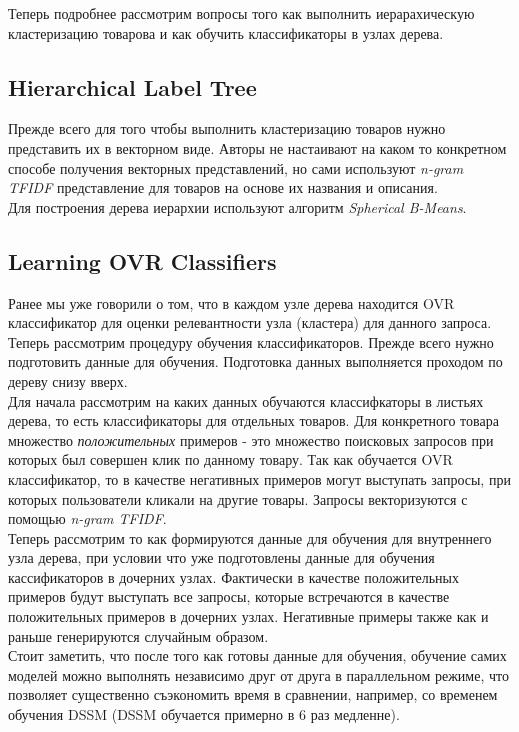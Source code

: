Теперь подробнее рассмотрим вопросы того как выполнить иерарахическую кластеризацию товарова и как обучить классификаторы в узлах дерева.

\subsection*{Hierarchical Label Tree}

Прежде всего для того чтобы выполнить кластеризацию товаров нужно представить их в векторном виде.
Авторы не настаивают на каком то конкретном способе получения векторных представлений, но сами используют \textit{n-gram TFIDF} представление для товаров на основе их названия и описания. \\

Для построения дерева иерархии используют алгоритм \textit{Spherical B-Means}.

\subsection*{Learning OVR Classifiers}

Ранее мы уже говорили о том, что в каждом узле дерева находится OVR классификатор для оценки релевантности узла (кластера) для данного запроса.
Теперь рассмотрим процедуру обучения классификаторов. 
Прежде всего нужно подготовить данные для обучения. 
Подготовка данных выполняется проходом по дереву снизу вверх.\\

Для начала рассмотрим на каких данных обучаются классифкаторы в листьях дерева, то есть классификаторы для отдельных товаров.
Для конкретного товара множество \textit{положительных} примеров - это множество поисковых запросов при которых был совершен клик по данному товару.
Так как обучается OVR классификатор, то в качестве негативных примеров могут выступать запросы, при которых пользователи кликали на другие товары.
Запросы векторизуются с помощью \textit{n-gram TFIDF}. \\

Теперь рассмотрим то как формируются данные для обучения для внутреннего узла дерева, при условии что уже подготовлены данные для обучения кассификаторов в дочерних узлах.
Фактически в качестве положительных примеров будут выступать все запросы, которые встречаются в качестве положительных примеров в дочерних узлах.
Негативные примеры также как и раньше генерируются случайным образом. \\

Стоит заметить, что после того как готовы данные для обучения, обучение самих моделей можно выполнять независимо друг от друга в параллельном режиме, что позволяет существенно съэкономить время в сравнении, например, со временем обучения DSSM (DSSM обучается примерно в 6 раз медленне).

